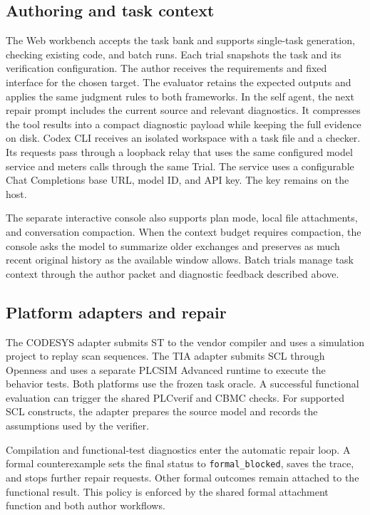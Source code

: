 \subsection{Authoring and task context}

The Web workbench accepts the task bank and supports single-task generation, checking existing code, and batch runs. Each trial snapshots the task and its verification configuration. The author receives the requirements and fixed interface for the chosen target. The evaluator retains the expected outputs and applies the same judgment rules to both frameworks. In the self agent, the next repair prompt includes the current source and relevant diagnostics. It compresses the tool results into a compact diagnostic payload while keeping the full evidence on disk. Codex CLI receives an isolated workspace with a task file and a checker. Its requests pass through a loopback relay that uses the same configured model service and meters calls through the same Trial. The service uses a configurable Chat Completions base URL, model ID, and API key. The key remains on the host.

The separate interactive console also supports plan mode, local file attachments, and conversation compaction. When the context budget requires compaction, the console asks the model to summarize older exchanges and preserves as much recent original history as the available window allows. Batch trials manage task context through the author packet and diagnostic feedback described above.

\subsection{Platform adapters and repair}

The CODESYS adapter submits ST to the vendor compiler and uses a simulation project to replay scan sequences. The TIA adapter submits SCL through Openness and uses a separate PLCSIM Advanced runtime to execute the behavior tests. Both platforms use the frozen task oracle. A successful functional evaluation can trigger the shared PLCverif and CBMC checks. For supported SCL constructs, the adapter prepares the source model and records the assumptions used by the verifier.

Compilation and functional-test diagnostics enter the automatic repair loop. A formal counterexample sets the final status to \texttt{formal\_blocked}, saves the trace, and stops further repair requests. Other formal outcomes remain attached to the functional result. This policy is enforced by the shared formal attachment function and both author workflows.

